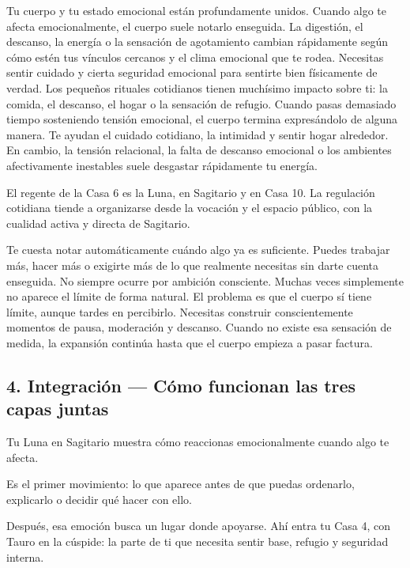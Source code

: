 \documentclass[11pt,a4paper]{article}
\begin{document}
Tu cuerpo y tu estado emocional están profundamente unidos. Cuando algo te afecta emocionalmente, el cuerpo suele notarlo enseguida. La digestión, el descanso, la energía o la sensación de agotamiento cambian rápidamente según cómo estén tus vínculos cercanos y el clima emocional que te rodea. Necesitas sentir cuidado y cierta seguridad emocional para sentirte bien físicamente de verdad. Los pequeños rituales cotidianos tienen muchísimo impacto sobre ti: la comida, el descanso, el hogar o la sensación de refugio. Cuando pasas demasiado tiempo sosteniendo tensión emocional, el cuerpo termina expresándolo de alguna manera. Te ayudan el cuidado cotidiano, la intimidad y sentir hogar alrededor. En cambio, la tensión relacional, la falta de descanso emocional o los ambientes afectivamente inestables suele desgastar rápidamente tu energía.

El regente de la Casa 6 es la Luna, en Sagitario y en Casa 10. La regulación cotidiana tiende a organizarse desde la vocación y el espacio público, con la cualidad activa y directa de Sagitario.

Te cuesta notar automáticamente cuándo algo ya es suficiente. Puedes trabajar más, hacer más o exigirte más de lo que realmente necesitas sin darte cuenta enseguida. No siempre ocurre por ambición consciente. Muchas veces simplemente no aparece el límite de forma natural. El problema es que el cuerpo sí tiene límite, aunque tardes en percibirlo. Necesitas construir conscientemente momentos de pausa, moderación y descanso. Cuando no existe esa sensación de medida, la expansión continúa hasta que el cuerpo empieza a pasar factura.

\vspace{0.8cm}

\subsection{4. Integración — Cómo funcionan las tres capas juntas}

Tu Luna en Sagitario muestra cómo reaccionas emocionalmente cuando algo te afecta.

Es el primer movimiento: lo que aparece antes de que puedas ordenarlo, explicarlo o decidir qué hacer con ello.

Después, esa emoción busca un lugar donde apoyarse. Ahí entra tu Casa 4, con Tauro en la cúspide: la parte de ti que necesita sentir base, refugio y seguridad interna.
\end{document}
